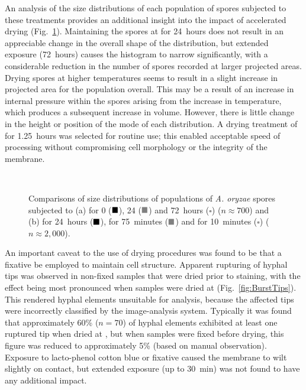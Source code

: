 An analysis of the size distributions of each population of spores subjected to these treatments provides an additional insight into the impact of accelerated drying (Fig.~\ref{fig:SporeDryDist}). Maintaining the spores at  for 24~hours does not result in an appreciable change in the overall shape of the distribution, but extended exposure (72~hours) causes the histogram to narrow significantly, with a considerable reduction in the number of spores recorded at larger projected areas. Drying spores at higher temperatures seems to result in a slight increase in projected area for the population overall. This may be a result of an increase in internal pressure within the spores arising from the increase in temperature, which produces a subsequent increase in volume. However, there is little change in the height or position of the mode of each distribution. A drying treatment of  for 1.25~hours was selected for routine use; this enabled acceptable speed of processing without compromising cell morphology or the integrity of the membrane.

\begin{figure}[htbp]
	\centering
	\captionsetup[subfloat]{position=top}
	\\
	\caption{Comparisons of size distributions of populations of \emph{A. oryzae} spores subjected to (a)  for 0 ($\blacksquare$), 24 ($\color{gray} \bs$) and 72~hours ($\square$) ($n \approx 700$) and (b)  for 24~hours ($\blacksquare$),  for 75~minutes ($\color{gray} \bs$) and  for 10~minutes ($\square$) ($n \approx 2,000$).}
	\label{fig:SporeDryDist}
\end{figure}

An important caveat to the use of drying procedures was found to be that a fixative be employed to maintain cell structure. Apparent rupturing of hyphal tips was observed in non-fixed samples that were dried prior to staining, with the effect being most pronounced when samples were dried at  (Fig.~\ref{fig:BurstTips}). This rendered hyphal elements unsuitable for analysis, because the affected tips were incorrectly classified by the image-analysis system. Typically it was found that approximately 60\% ($n = 70$) of hyphal elements exhibited at least one ruptured tip when dried at , but when samples were fixed before drying, this figure was reduced to approximately 5\% (based on manual observation). Exposure to lacto-phenol cotton blue or fixative caused the membrane to wilt slightly on contact, but extended exposure (up to 30~min) was not found to have any additional impact.

